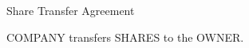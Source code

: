\documentclass[12pt,letterpaper,oneside]{article}
\begin{document}
Share Transfer Agreement

COMPANY transfers SHARES to the OWNER.
\end{document}
